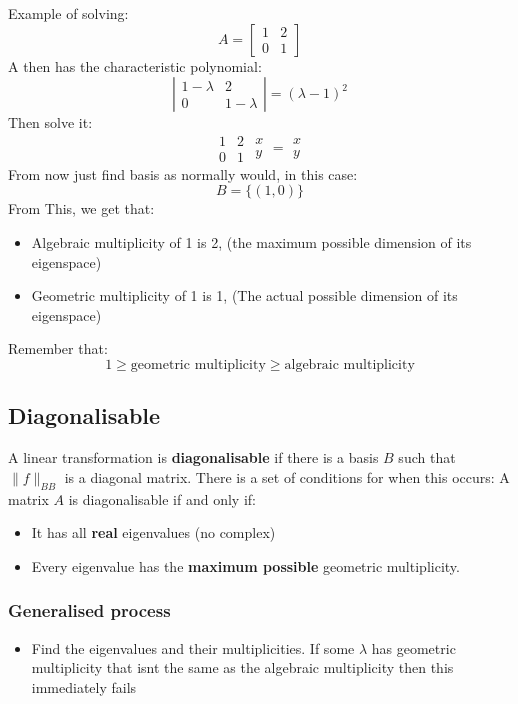 \documentclass[11pt]{book}
\begin{document}
{{Example of solving:
\[
A=\left[\begin{matrix}
	1 & 2 \\ 0 & 1
\end{matrix}\right]
\] 
A then has the characteristic polynomial: \[
\left|
\begin{matrix}
	1-\lambda & 2 \\ 0 & 1-\lambda
\end{matrix}
\right|=\left(\lambda-1\right)^{2}
\] 
Then solve it: \[
\begin{matrix}
	1 & 2 \\ 0 & 1
\end{matrix}
\begin{matrix}
	x \\y
\end{matrix}=
\begin{matrix}
	x \\y
\end{matrix}
\] 
From now just find basis as normally would, in this case: \[
B=\lbrace\left(1,0\right)\rbrace
\] 
From This, we get that: 
\begin{itemize}
	\item{Algebraic multiplicity of 1 is 2, (the maximum possible dimension of its eigenspace)}
	\item{Geometric multiplicity of 1 is 1, (The actual possible dimension of its eigenspace)}
\end{itemize} Remember that: \[
1\ge\text{geometric multiplicity}\ge\text{algebraic multiplicity}
\] 
\subsection{Diagonalisable}
\par{A linear transformation is \textbf{diagonalisable} if there is a basis $B$ such that $\|f\|_{BB}$ is a diagonal matrix. There is a set of conditions for when this occurs:}
A matrix $A$ is diagonalisable if and only if:
\begin{itemize}
	\item{It has all \textbf{real} eigenvalues (no complex)}
	\item{Every eigenvalue has the \textbf{maximum possible} geometric multiplicity.}
\end{itemize}
\subsubsection{Generalised process}
\begin{itemize}
	\item{Find the eigenvalues and their multiplicities. If some $\lambda$ has geometric multiplicity that isnt the same as the algebraic multiplicity then this immediately fails }
\end{itemize}
}}
\end{document}
